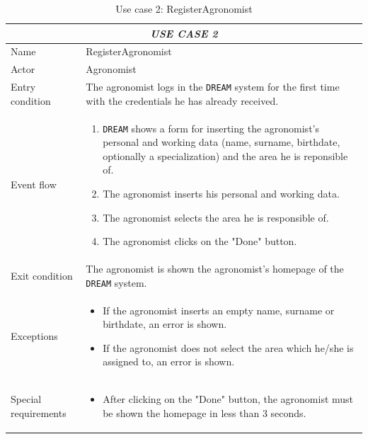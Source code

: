 \documentclass{article}
\begin{document}
\centering
\begin{longtable}{|p{3.5cm}|m{8cm}|}
\caption{Use case 2: RegisterAgronomist}
 \label{uc2}
 \hline
 \multicolumn{2}{|c|}{\cellcolor{white}\emph{USE CASE 2}} \\
 \endfirsthead
 \endhead
 \endfoot
 \endlastfoot
 \hline
 Name & RegisterAgronomist\\
 \hline
 Actor & Agronomist\\
 \hline
 Entry condition & The agronomist logs in the \verb|DREAM| system for the first time with the credentials he has already received.\\
 \hline
 Event flow & \begin{enumerate}
    \item \verb|DREAM| shows a form for inserting the agronomist's personal and working data (name, surname, birthdate, optionally a specialization) and the area he is reponsible of.
    \item The agronomist inserts his personal and working data.
    \item The agronomist selects the area he is responsible of.
    \item The agronomist clicks on the "Done" button.
 \end{enumerate}\\
 \hline
 Exit condition & The agronomist is shown the agronomist's homepage of the \verb|DREAM| system.\\
 \hline
 Exceptions & \begin{itemize}
     \item If the agronomist inserts an empty name, surname or birthdate, an error is shown.
     \item If the agronomist does not select the area which he/she is assigned to, an error is shown.
 \end{itemize}\\
 \hline
 Special requirements & \begin{itemize}
     \item After clicking on the "Done" button, the agronomist must be shown the homepage in less than 3 seconds.
 \end{itemize}\\
 \hline
\end{longtable}
\end{document}
